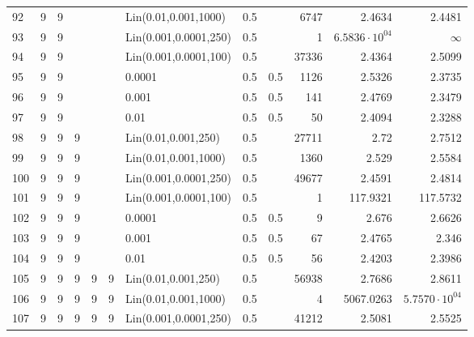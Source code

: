\begin{longtable}{lrrrrrlrrrrr}
  92 &       9 & 9 &   &   &   &  Lin(0.01,0.001,1000) &  0.5 &        &    6747 &                 2.4634 &                2.4481 \\
  93 &       9 & 9 &   &   &   & Lin(0.001,0.0001,250) &  0.5 &        &       1 &  $6.5836\cdot 10^{04}$ &              $\infty$ \\
  94 &       9 & 9 &   &   &   & Lin(0.001,0.0001,100) &  0.5 &        &   37336 &                 2.4364 &                2.5099 \\
  95 &       9 & 9 &   &   &   &                0.0001 &  0.5 &    0.5 &    1126 &                 2.5326 &                2.3735 \\
  96 &       9 & 9 &   &   &   &                 0.001 &  0.5 &    0.5 &     141 &                 2.4769 &                2.3479 \\
  97 &       9 & 9 &   &   &   &                  0.01 &  0.5 &    0.5 &      50 &                 2.4094 &                2.3288 \\
  98 &       9 & 9 & 9 &   &   &   Lin(0.01,0.001,250) &  0.5 &        &   27711 &                   2.72 &                2.7512 \\
  99 &       9 & 9 & 9 &   &   &  Lin(0.01,0.001,1000) &  0.5 &        &    1360 &                  2.529 &                2.5584 \\
 100 &       9 & 9 & 9 &   &   & Lin(0.001,0.0001,250) &  0.5 &        &   49677 &                 2.4591 &                2.4814 \\
 101 &       9 & 9 & 9 &   &   & Lin(0.001,0.0001,100) &  0.5 &        &       1 &               117.9321 &              117.5732 \\
 102 &       9 & 9 & 9 &   &   &                0.0001 &  0.5 &    0.5 &       9 &                  2.676 &                2.6626 \\
 103 &       9 & 9 & 9 &   &   &                 0.001 &  0.5 &    0.5 &      67 &                 2.4765 &                 2.346 \\
 104 &       9 & 9 & 9 &   &   &                  0.01 &  0.5 &    0.5 &      56 &                 2.4203 &                2.3986 \\
 105 &       9 & 9 & 9 & 9 & 9 &   Lin(0.01,0.001,250) &  0.5 &        &   56938 &                 2.7686 &                2.8611 \\
 106 &       9 & 9 & 9 & 9 & 9 &  Lin(0.01,0.001,1000) &  0.5 &        &       4 &              5067.0263 & $5.7570\cdot 10^{04}$ \\
 107 &       9 & 9 & 9 & 9 & 9 & Lin(0.001,0.0001,250) &  0.5 &        &   41212 &                 2.5081 &                2.5525 \\

\end{longtable}
